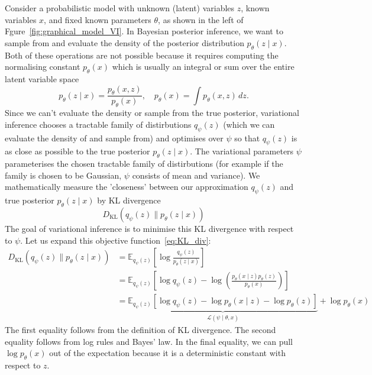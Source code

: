 \documentclass[12pt,a4paper]{report}
\begin{document}
Consider a probabilistic model with unknown (latent) variables $z$, known variables $x$, and fixed known parameters $\theta$, as shown in the left of Fgure~\ref{fig:graphical_model_VI}. 
In Bayesian posterior inference, we want to sample from and evaluate the density of the posterior distribution $p_\theta(z \mid x)$.
Both of these operations are not possible because it requires computing the normalising constant $p_\theta(x)$ which is usually an integral or sum over the entire latent variable space
$$ p_\theta(z \mid x) = \frac{p_\theta(x, z)}{p_\theta(x)}, \quad p_\theta(x) = \int p_\theta(x, z) \, dz. $$
Since we can't evaluate the density or sample from the true posterior, variational inference chooses a tractable family of distirbutions $q_\psi(z)$ (which we can evaluate the density of and sample from) and optimises over $\psi$ so that $q_\psi(z)$ is as close as possible to the true posterior $p_\theta(z \mid x)$. The variational parameters $\psi$ parameterises the chosen tractable family of distirbutions (for example if the family is chosen to be Gaussian, $\psi$ consists of mean and variance). We mathematically measure the 'closeness' between our approximation $q_\psi(z)$ and true posterior $p_\theta(z \mid x)$ by KL divergence
\begin{equation}
\label{eq:KL_div}
    D_{\text{KL}}(q_\psi(z) \parallel p_\theta(z \mid x))
\end{equation}
The goal of variational inference is to minimise this KL divergence with respect to $\psi$. Let us expand this objective function~\ref{eq:KL_div}:
\begin{align*}
D_{\text{KL}}(q_\psi(z) \parallel p_\theta(z \mid x)) &= \mathbb{E}_{q_\psi(z)} \left[ \log \frac{q_\psi(z)}{p_\theta(z \mid x)} \right] \\
&= \mathbb{E}_{q_\psi(z)} \left[ \log q_\psi(z) - \log \left( \frac{p_\theta(x \mid z)p_\theta(z)}{p_\theta(x)} \right) \right] \\
&= \underbrace{ \mathbb{E}_{q_\psi(z)} [\log q_\psi(z) - \log p_\theta(x \mid z) - \log p_\theta(z)] }_{{\mathcal{L}}(\psi \mid \theta, x)} + \log p_\theta(x)
\end{align*}
The first equality follows from the definition of KL divergence. The second equality follows from log rules and Bayes' law. In the final equality, we can pull $\log p_\theta(x)$ out of the expectation because it is a deterministic constant with respect to $z$. 
\end{document}
